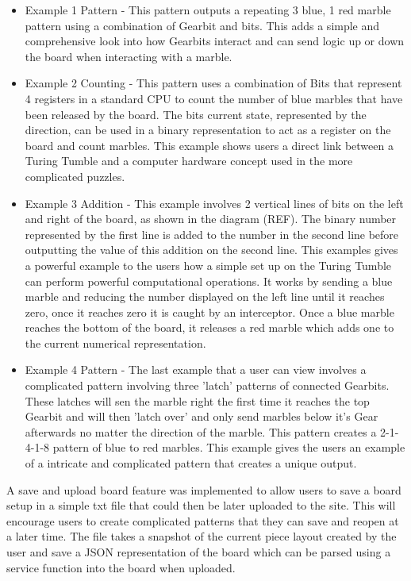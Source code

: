 \documentclass{l4proj}
\begin{document}
\begin{itemize}
    \item Example 1 Pattern - This pattern outputs a repeating 3 blue, 1 red marble pattern using a combination of Gearbit and bits. This adds a simple and comprehensive look into how Gearbits interact and can send logic up or down the board when interacting with a marble.
    \item Example 2 Counting - This pattern uses a combination of Bits that represent 4 registers in a standard CPU to count the number of blue marbles that have been released by the board. The bits current state, represented by the direction, can be used in a binary representation to act as a register on the board and count marbles. This example shows users a direct link between a Turing Tumble and a computer hardware concept used in the more complicated puzzles.
    \item Example 3 Addition - This example involves 2 vertical lines of bits on the left and right of the board, as shown in the diagram (REF). The binary number represented by the first line is added to the number in the second line before outputting the value of this addition on the second line. This examples gives a powerful example to the users how a simple set up on the Turing Tumble can perform powerful computational operations. It works by sending a blue marble and reducing the number displayed on the left line until it reaches zero, once it reaches zero it is caught by an interceptor. Once a blue marble reaches the bottom of the board, it releases a red marble which adds one to the current numerical representation.
    \item  Example 4 Pattern - The last example that a user can view involves a complicated pattern involving three 'latch' patterns of connected Gearbits. These latches will sen the marble right the first time it reaches the top Gearbit and will then 'latch over' and only send marbles below it's Gear afterwards no matter the direction of the marble. This pattern creates a 2-1-4-1-8 pattern of blue to red marbles. This example gives the users an example of a intricate and complicated pattern that creates a unique output. 
\end{itemize}

A save and upload board feature was implemented to allow users to save a board setup in a simple txt file that could then be later uploaded to the site. This will encourage users to create complicated patterns that they can save and reopen at a later time. The file takes a snapshot of the current piece layout created by the user and save a JSON representation of the board which can be parsed using a service function into the board when uploaded.
\end{document}
